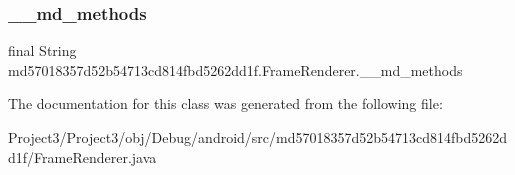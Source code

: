\subsubsection{\texorpdfstring{\+\_\+\+\_\+md\+\_\+methods}{\_\_md\_methods}}
{\footnotesize\ttfamily final String md57018357d52b54713cd814fbd5262dd1f.\+Frame\+Renderer.\+\_\+\+\_\+md\+\_\+methods\hspace{0.3cm}{\ttfamily [static]}}



The documentation for this class was generated from the following file\+:\begin{DoxyCompactItemize}
\item 
Project3/\+Project3/obj/\+Debug/android/src/md57018357d52b54713cd814fbd5262dd1f/Frame\+Renderer.\+java\end{DoxyCompactItemize}
